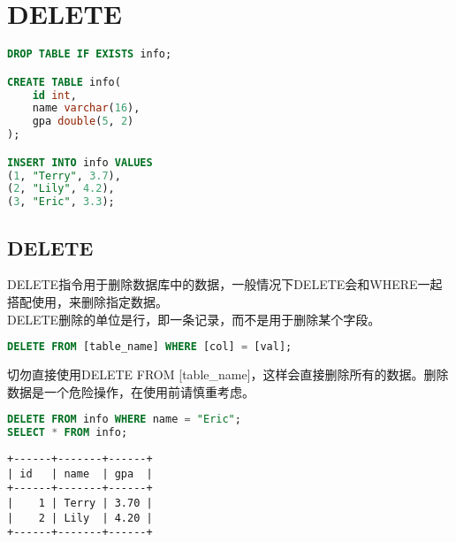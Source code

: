 \documentclass[12pt, openany, oneside]{book}
\begin{document}
\newpage

\chapter{DELETE}

\vspace{0.5cm}


\begin{lstlisting}[language=SQL]
DROP TABLE IF EXISTS info;

CREATE TABLE info(
    id int,
    name varchar(16),
    gpa double(5, 2)
);

INSERT INTO info VALUES
(1, "Terry", 3.7),
(2, "Lily", 4.2),
(3, "Eric", 3.3);
\end{lstlisting}

\vspace{0.5cm}

\section{DELETE}

DELETE指令用于删除数据库中的数据，一般情况下DELETE会和WHERE一起搭配使用，来删除指定数据。\\

DELETE删除的单位是行，即一条记录，而不是用于删除某个字段。

\vspace{-0.5cm}

\begin{lstlisting}[language=SQL]
DELETE FROM [table_name] WHERE [col] = [val];
\end{lstlisting}

切勿直接使用DELETE FROM [table\_name]，这样会直接删除所有的数据。删除数据是一个危险操作，在使用前请慎重考虑。\\


\begin{lstlisting}[language=SQL]
DELETE FROM info WHERE name = "Eric";
SELECT * FROM info;
\end{lstlisting}

\begin{tcolorbox}
	\begin{verbatim}
+------+-------+------+
| id   | name  | gpa  |
+------+-------+------+
|    1 | Terry | 3.70 |
|    2 | Lily  | 4.20 |
+------+-------+------+
\end{verbatim}
\end{tcolorbox}
\end{document}
